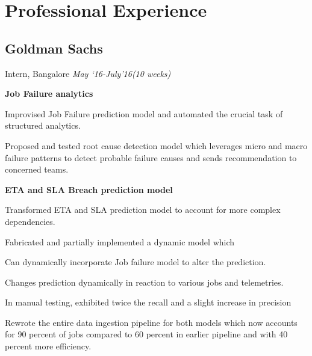 \documentclass[letterpaper]{twentysecondcv} %
\begin{document}




\makeprofile %

\vspace{-2mm}
\section{Professional Experience}
\vspace{-2mm}

\subsection{\textbf{Goldman Sachs}}
\vspace{-2mm}
Intern, Bangalore \hfill \emph{May `16-July'16(10 weeks)}\\
\vspace{-4mm}\begin{list3}
\item \textbf{Job Failure analytics}
  \begin{list3}
  \item Improvised Job Failure prediction model and automated the
    crucial task of structured analytics.
  \item Proposed and tested root cause detection model which leverages
    micro and macro failure patterns to detect probable failure causes
    and sends recommendation to concerned teams.
  \end{list3}
  \item \textbf{ETA and SLA Breach prediction model}
  \begin{list3}
  \item Transformed ETA and SLA prediction model to account for more
    complex dependencies.
  \item Fabricated and partially implemented a dynamic model which
    \begin{list3}
    \item Can dynamically incorporate Job failure model to alter the
      prediction.
    \item Changes prediction dynamically in reaction to various
      jobs and telemetries.
    \item In manual testing, exhibited twice the recall and a slight
      increase in precision
    \end{list3}
  \end{list3}
\item Rewrote the entire data ingestion pipeline for both models which now
  accounts for 90 percent of jobs compared to 60 percent in earlier
  pipeline and with 40 percent more efficiency.
  \newline
  \newline
\end{list3}
\end{document}
